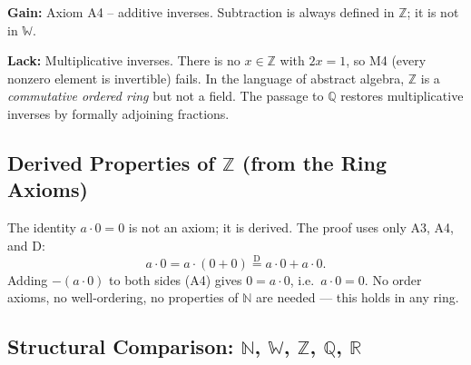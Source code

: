 \begin{remark*}
\textbf{Gain:} Axiom A4 -- additive inverses. Subtraction is always defined
in $\mathbb{Z}$; it is not in $\mathbb{W}$.

\textbf{Lack:} Multiplicative inverses. There is no $x \in \mathbb{Z}$
with $2x = 1$, so M4 (every nonzero element is invertible) fails.
In the language of abstract algebra, $\mathbb{Z}$ is a
\emph{commutative ordered ring} but not a field.
The passage to $\mathbb{Q}$ restores multiplicative inverses by formally
adjoining fractions.
\end{remark*}

\subsection*{\texorpdfstring{Derived Properties of $\mathbb{Z}$ (from the Ring Axioms)}{Derived Properties of Z (from the Ring Axioms)}}

\begin{remark*}
The identity $a \cdot 0 = 0$ is not an axiom; it is derived.
The proof uses only A3, A4, and D:
\[
a \cdot 0
= a \cdot (0 + 0)
\overset{\text{D}}{=} a \cdot 0 + a \cdot 0.
\]
Adding $-(a \cdot 0)$ to both sides (A4) gives $0 = a \cdot 0$, i.e.\ $a \cdot 0 = 0$.
No order axioms, no well-ordering, no properties of $\mathbb{N}$ are needed ---
this holds in any ring.
\end{remark*}

\subsection*{\texorpdfstring{Structural Comparison: $\mathbb{N}$, $\mathbb{W}$, $\mathbb{Z}$, $\mathbb{Q}$, $\mathbb{R}$}{Structural Comparison: N, W, Z, Q, R}}

